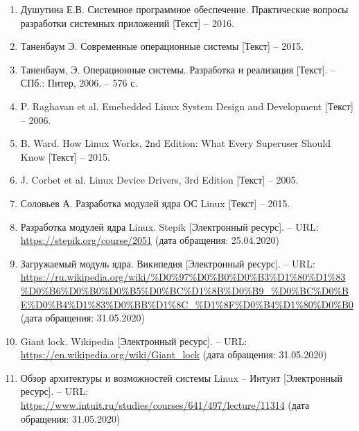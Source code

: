 \begin{enumerate}
	\item Душутина Е.В. Системное программное обеспечение. Практические вопросы разработки системных приложений [Текст] -- 2016.
	\item Таненбаум Э. Современные операционные системы [Текст] -- 2015.
	\item Таненбаум, Э. Операционные системы. Разработка и реализация [Текст]. -- СПб.: Питер, 2006. -- 576 с.
	\item P. Raghavan et al. Emebedded Linux System Design and Development [Текст] -- 2006.
	\item B. Ward. How Linux Works, 2nd Edition: What Every Superuser Should Know [Текст] -- 2015.
	\item J. Corbet et al. Linux Device Drivers, 3rd Edition [Текст] -- 2005.
	\item Соловьев А. Разработка модулей ядра ОС Linux [Текст] -- 2015.
	\item Разработка модулей ядра Linux. Stepik [Электронный ресурс]. -- URL: \url{https://stepik.org/course/2051} (дата обращения: 25.04.2020)
	\item Загружаемый модуль ядра. Википедия [Электронный ресурс]. -- URL: \url{https://ru.wikipedia.org/wiki/%D0%97%D0%B0%D0%B3%D1%80%D1%83%D0%B6%D0%B0%D0%B5%D0%BC%D1%8B%D0%B9_%D0%BC%D0%BE%D0%B4%D1%83%D0%BB%D1%8C_%D1%8F%D0%B4%D1%80%D0%B0} (дата обращения: 31.05.2020)
	\item Giant lock. Wikipedia [Электронный ресурс]. -- URL: \url{https://en.wikipedia.org/wiki/Giant_lock} (дата обращения: 31.05.2020)
	\item Обзор архитектуры и возможностей системы Linux -- Интуит [Электронный ресурс]. -- URL: \url{https://www.intuit.ru/studies/courses/641/497/lecture/11314} (дата обращения: 31.05.2020)
\end{enumerate}


